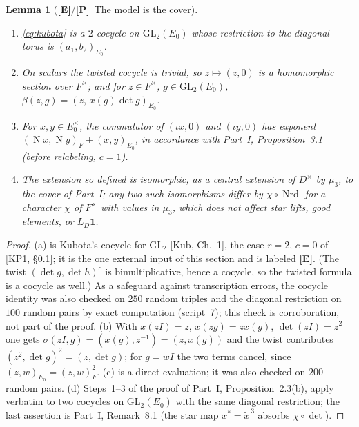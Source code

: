 \documentclass[11pt]{article}
\newcommand{\Nm}{\operatorname N}
\newcommand{\Nrd}{\operatorname{Nrd}}
\newcommand{\Ptag}{\textnormal{\textbf{[P]}}}
\newcommand{\Etag}{\textnormal{\textbf{[E]}}}
\theoremstyle{plain}
\newtheorem{lemma}[theorem]{Lemma}
\theoremstyle{definition}
\begin{document}
\begin{lemma}[\Etag/\Ptag\ The model is the cover]\label{lem:model}
\begin{enumerate}[label=(\alph*)]
\item \eqref{eq:kubota} is a $2$-cocycle on $\mathrm{GL}_2(E_0)$ whose
restriction to the diagonal torus is $(a_1,b_2)_{E_0}$.
\item On scalars the twisted cocycle is trivial, so $z\mapsto(z,0)$ is a
homomorphic section over $F^\times$; and for $z\in F^\times$, $g\in\mathrm{GL}_2(E_0)$,
$\beta(z,g)=(z,\,x(g)\det g)_{E_0}$.
\item For $x,y\in E_0^\times$, the commutator of $(\iota x,0)$ and
$(\iota y,0)$ has exponent $(\Nm x,\Nm y)_F+(x,y)_{E_0}$, in accordance
with Part~I, Proposition~3.1 (before relabeling, $c=1$).
\item The extension so defined is isomorphic, as a central extension of
$D^\times$ by $\mu_3$, to the cover of Part~I; any two such isomorphisms
differ by $\chi\circ\Nrd$ for a character $\chi$ of $F^\times$ with
values in $\mu_3$, which does not affect star lifts, good elements, or
$L_D\mathbf1$.
\end{enumerate}
\end{lemma}
\begin{proof}
(a) is Kubota's cocycle for $\mathrm{GL}_2$ [Kub, Ch.~1], the case
$r=2$, $c=0$ of [KP1, \S0.1]; it is the one external input of this
section and is labeled \Etag.  (The twist $(\det g,\det h)^{c}$ is
bimultiplicative, hence a cocycle, so the twisted formula is a cocycle
as well.)  As a safeguard against transcription errors, the cocycle
identity was also checked on $250$ random triples and the diagonal
restriction on $100$ random pairs by exact computation (script~7); this
check is corroboration, not part of the proof.  (b) With $x(zI)=z$, $x(zg)=zx(g)$, $\det(zI)=z^2$ one gets
$\sigma(zI,g)=(x(g),z^{-1})=(z,x(g))$ and the twist contributes
$(z^2,\det g)^2=(z,\det g)$; for $g=wI$ the two terms cancel, since
$(z,w)_{E_0}=(z,w)_F^2$.  (c) is a direct evaluation; it was also
checked on $200$ random pairs.  (d) Steps~1--3 of the proof of Part~I,
Proposition~2.3(b), apply verbatim to two cocycles on $\mathrm{GL}_2(E_0)$
with the same diagonal restriction; the last assertion is Part~I,
Remark~8.1 (the star map $x^*=\tilde x^{\,3}$ absorbs $\chi\circ\det$).
\end{proof}
\end{document}
